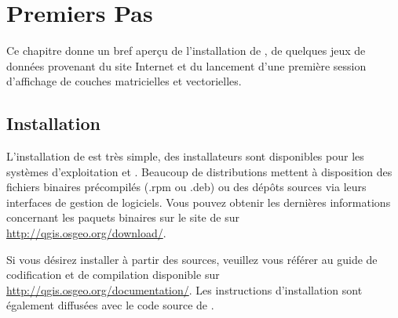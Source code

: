 
\chapter{Premiers Pas}\label{label_getstarted}



Ce chapitre donne un bref aperçu de l'installation de \qg, de quelques jeux de données provenant du site Internet et du lancement d'une première session d'affichage de couches matricielles et vectorielles.

\section{Installation}\label{label_installation}


L'installation de \qg est très simple, des installateurs sont disponibles pour les systèmes d'exploitation \mswin et \mac. Beaucoup de distributions \tux mettent à disposition des fichiers binaires précompilés (.rpm ou .deb) ou des dépôts sources via leurs interfaces de gestion de logiciels. Vous pouvez obtenir les dernières informations concernant les paquets binaires sur le site de \qg sur \url{http://qgis.osgeo.org/download/}.




Si vous désirez installer \qg à  partir des sources, veuillez vous référer au guide de codification et de compilation disponible sur \url{http://qgis.osgeo.org/documentation/}.
Les instructions d'installation sont également diffusées avec le code source de \qg.

